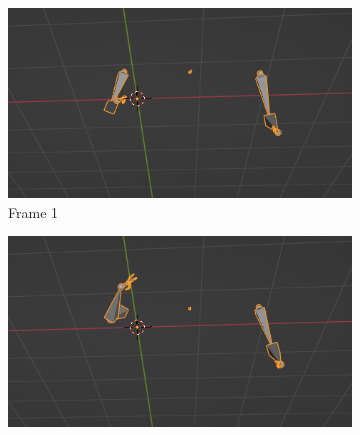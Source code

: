 \begin{figure}[t]
\begin{subfigure}[t]{0.3\textwidth}
		\includegraphics[align=t,width=0.9\linewidth, height =0.9\linewidth]{Graphics/blender_bvh_2.png}
		\caption{Frame 1}
		\label{f:bframe1}
	\end{subfigure}	
	\vskip 0pt
	\begin{subfigure}[t]{0.3\textwidth}
		\centering
		\includegraphics[align=t,width=0.9\linewidth, height =0.9\linewidth]{Graphics/blender_bvh_3.png}

\end{subfigure}
\end{figure}
